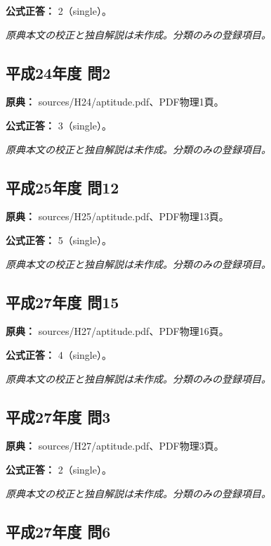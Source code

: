 \textbf{公式正答：} 2（single）。

\par\textit{原典本文の校正と独自解説は未作成。分類のみの登録項目。}

\subsection{平成24年度 問2}
\label{q:h24-reg-apt-02}

\noindent\textbf{原典：} sources/H24/aptitude.pdf、PDF物理1頁。

\textbf{公式正答：} 3（single）。

\par\textit{原典本文の校正と独自解説は未作成。分類のみの登録項目。}

\subsection{平成25年度 問12}
\label{q:h25-reg-apt-12}

\noindent\textbf{原典：} sources/H25/aptitude.pdf、PDF物理13頁。

\textbf{公式正答：} 5（single）。

\par\textit{原典本文の校正と独自解説は未作成。分類のみの登録項目。}

\subsection{平成27年度 問15}
\label{q:h27-reg-apt-15}

\noindent\textbf{原典：} sources/H27/aptitude.pdf、PDF物理16頁。

\textbf{公式正答：} 4（single）。

\par\textit{原典本文の校正と独自解説は未作成。分類のみの登録項目。}

\subsection{平成27年度 問3}
\label{q:h27-reg-apt-03}

\noindent\textbf{原典：} sources/H27/aptitude.pdf、PDF物理3頁。

\textbf{公式正答：} 2（single）。

\par\textit{原典本文の校正と独自解説は未作成。分類のみの登録項目。}

\subsection{平成27年度 問6}
\label{q:h27-reg-apt-06}

